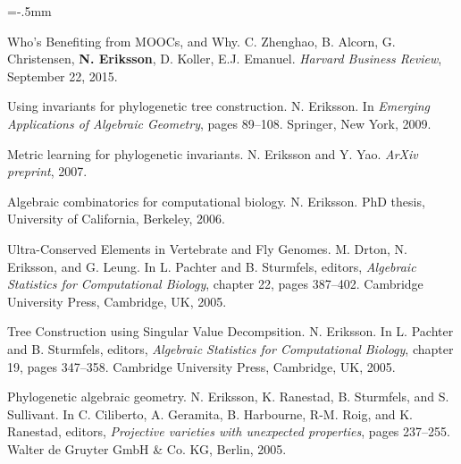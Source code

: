 \documentclass[11pt]{article}
\newenvironment{papers}[1][1]
	{\vspace{-2ex}\leftmargini=16.1mm%
	 \begin{revnumerate}[{#1}]\itemsep=-.5mm}
	{\end{revnumerate}\vspace{-2ex}}
\def\paper{\item}
\def\paperyear#1{\item[\addtocounter{enumi}{-1}%
		 {\makebox[0mm][r]{\makebox[14mm]{#1\hfill\arabic{enumi}.}}}]}
\begin{document}
\begin{papers}[7]%

            \paperyear{2015}
        Who's Benefiting from MOOCs, and Why.
        C. Zhenghao, B. Alcorn, G. Christensen, \textbf{N. Eriksson}, D. Koller, E.J. Emanuel.
        \textit{Harvard Business Review}, September 22, 2015.
                \paperyear{2009}
        Using invariants for phylogenetic tree construction.
        N. Eriksson.
        In \textit{Emerging Applications of Algebraic Geometry}, pages 89--108. Springer, New York, 2009.
                \paperyear{2007}
        Metric learning for phylogenetic invariants.
        N. Eriksson and Y. Yao.
        \textit{ArXiv preprint}, 2007.
                \paperyear{2006}
        Algebraic combinatorics for computational biology.
        N. Eriksson.
        PhD thesis, University of California, Berkeley, 2006.
                \paperyear{2005}
        Ultra-Conserved Elements in Vertebrate and Fly Genomes.
        M. Drton, N. Eriksson, and G. Leung.
        In L. Pachter and B. Sturmfels, editors, \textit{Algebraic Statistics for Computational Biology}, chapter 22, pages 387--402. Cambridge University Press, Cambridge, UK, 2005.
            \paper
        Tree Construction using Singular Value Decompsition.
        N. Eriksson.
        In L. Pachter and B. Sturmfels, editors, \textit{Algebraic Statistics for Computational Biology}, chapter 19, pages 347--358. Cambridge University Press, Cambridge, UK, 2005.
            \paper
        Phylogenetic algebraic geometry.
        N. Eriksson,  K. Ranestad, B. Sturmfels, and S. Sullivant.
        In C. Ciliberto, A. Geramita, B. Harbourne, R-M. Roig, and K. Ranestad, editors, \textit{Projective varieties with unexpected properties}, pages 237--255. Walter de Gruyter GmbH \& Co. KG, Berlin, 2005.
    \end{papers}
\end{document}
